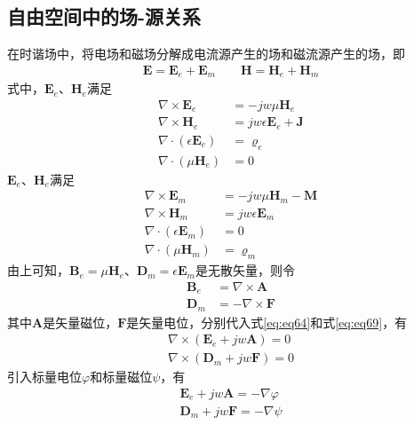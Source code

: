 \documentclass{article}
\numberwithin{equation}{section}
\begin{document}
\subsection{自由空间中的场-源关系}
在时谐场中，将电场和磁场分解成电流源产生的场和磁流源产生的场，即
\begin{align}
    \label{eq:eq63}
    \mathbf{E}=\mathbf{E}_e+\mathbf{E}_m \qquad \mathbf{H}=\mathbf{H}_e+\mathbf{H}_m
\end{align}
式中，$\mathbf{E}_e$、$\mathbf{H}_e$满足
\begin{align}
    \label{eq:eq64}
    \nabla \times \mathbf{E}_e&=-jw\mu\mathbf{H}_e \\
    \label{eq:eq65}
    \nabla \times \mathbf{H}_e&=jw\epsilon\mathbf{E}_e+\mathbf{J} \\
    \label{eq:eq66}
    \nabla \cdot (\epsilon\mathbf{E}_e)&=\varrho _{e} \\
    \label{eq:eq67}
    \nabla \cdot (\mu\mathbf{H}_e)&=0
\end{align}
$\mathbf{E}_e$、$\mathbf{H}_e$满足
\begin{align}
    \label{eq:eq68}
    \nabla \times \mathbf{E}_m&=-jw\mu\mathbf{H}_m-\mathbf{M} \\
    \label{eq:eq69}
    \nabla \times \mathbf{H}_m&=jw\epsilon\mathbf{E}_m \\
    \label{eq:eq70}
    \nabla \cdot (\epsilon\mathbf{E}_m)&=0 \\
    \label{eq:eq71}
    \nabla \cdot (\mu\mathbf{H}_m)&=\varrho _{m}
\end{align}
由上可知，$\mathbf{B}_e=\mu\mathbf{H}_e$、$\mathbf{D}_m=\epsilon\mathbf{E}_m$是无散矢量，则令
\begin{align}
    \label{eq:eq72}
    \mathbf{B}_e&=\nabla \times \mathbf{A} \\
    \label{eq:eq73}
    \mathbf{D}_m&=-\nabla \times \mathbf{F}
\end{align}
其中$\mathbf{A}$是矢量磁位，$\mathbf{F}$是矢量电位，分别代入式\ref{eq:eq64}和式\ref{eq:eq69}，有
\begin{align}
    \label{eq:eq74}
    \nabla \times (\mathbf{E}_e+jw\mathbf{A})=0 \\
    \label{eq:eq75}
    \nabla \times (\mathbf{D}_m+jw\mathbf{F})=0
\end{align}
引入标量电位$\varphi$和标量磁位$\psi$，有
\begin{align}
    \label{eq:eq76}
    \mathbf{E}_e+jw\mathbf{A}=-\nabla \varphi \\
    \label{eq:eq77}
    \mathbf{D}_m+jw\mathbf{F}=-\nabla \psi
\end{align}
\end{document}

